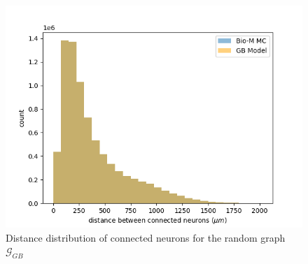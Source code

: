 \begin{figure}[H]
\begin{center}
\captionsetup{justification=centering}
\includegraphics[width=12cm]{GB/general_biol_dist_distr.png}
\caption{Distance distribution of connected neurons for the random graph $\mathcal{G}_{GB}$}
\end{center}
\end{figure}

